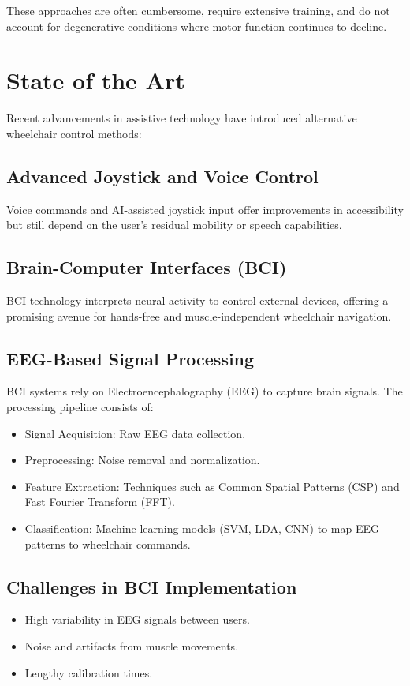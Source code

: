 \documentclass[a4paper]{article}
\begin{document}
These approaches are often cumbersome, require extensive training, and do not account
for degenerative conditions where motor function continues to decline.

\section{State of the Art}

Recent advancements in assistive technology have introduced alternative wheelchair
control methods:

\subsection{Advanced Joystick and Voice Control}
Voice commands and AI-assisted joystick input offer improvements in accessibility
but still depend on the user's residual mobility or speech capabilities.

\subsection{Brain-Computer Interfaces (BCI)}
BCI technology interprets neural activity to control external devices,
offering a promising avenue for hands-free and muscle-independent wheelchair navigation.

\subsection{EEG-Based Signal Processing}
BCI systems rely on Electroencephalography (EEG) to capture brain signals.
The processing pipeline consists of:
\begin{itemize}
    \item Signal Acquisition: Raw EEG data collection.
    \item Preprocessing: Noise removal and normalization.
    \item Feature Extraction: Techniques such as Common Spatial Patterns (CSP) and Fast Fourier Transform (FFT).
    \item Classification: Machine learning models (SVM, LDA, CNN) to map EEG patterns to wheelchair commands.
\end{itemize}

\subsection{Challenges in BCI Implementation}
\begin{itemize}
    \item High variability in EEG signals between users.
    \item Noise and artifacts from muscle movements.
    \item Lengthy calibration times.
\end{itemize}
\end{document}
